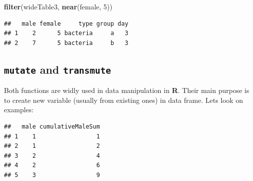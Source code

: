 \documentclass[]{book}
\newenvironment{Shaded}{\begin{snugshade}}{\end{snugshade}}
\newcommand{\KeywordTok}[1]{\textcolor[rgb]{0.12,0.11,0.11}{\textbf{#1}}}
\newcommand{\DataTypeTok}[1]{\textcolor[rgb]{0.00,0.34,0.68}{#1}}
\newcommand{\DecValTok}[1]{\textcolor[rgb]{0.69,0.50,0.00}{#1}}
\newcommand{\StringTok}[1]{\textcolor[rgb]{0.75,0.01,0.01}{#1}}
\newcommand{\OperatorTok}[1]{\textcolor[rgb]{0.12,0.11,0.11}{#1}}
\newcommand{\NormalTok}[1]{\textcolor[rgb]{0.12,0.11,0.11}{#1}}
\theoremstyle{definition}
\theoremstyle{definition}
\theoremstyle{definition}
\theoremstyle{remark}
\begin{document}
\begin{Shaded}
\begin{Highlighting}[]
\KeywordTok{filter}\NormalTok{(wideTable3, }\KeywordTok{near}\NormalTok{(female, }\DecValTok{5}\NormalTok{))}
\end{Highlighting}
\end{Shaded}

\begin{verbatim}
##   male female     type group day
## 1    2      5 bacteria     a   3
## 2    7      5 bacteria     b   3
\end{verbatim}

\subsection{\texorpdfstring{\texttt{mutate} and
\texttt{transmute}}{mutate and transmute}}\label{mutate-and-transmute}

Both functions are widly used in data manipulation in \textbf{R}. Their
main purpose is to create new variable (usually from existing ones) in
data frame. Lets look on examples:

\begin{Shaded}
\end{Shaded}

\begin{verbatim}
##   male cumulativeMaleSum
## 1    1                 1
## 2    1                 2
## 3    2                 4
## 4    2                 6
## 5    3                 9
\end{verbatim}

\begin{Shaded}
\end{Shaded}
\end{document}
